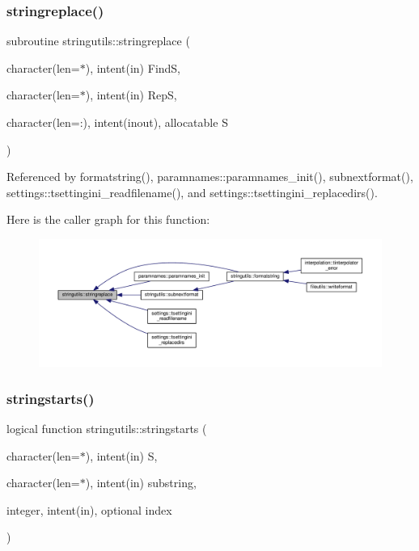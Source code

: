 \mbox{\label{namespacestringutils_aaf1a42410d8de4ec72b5f8f00f538f35}} 
\subsubsection{\texorpdfstring{stringreplace()}{stringreplace()}}
{\footnotesize\ttfamily subroutine stringutils\+::stringreplace (\begin{DoxyParamCaption}\item[{character(len=$\ast$), intent(in)}]{FindS,  }\item[{character(len=$\ast$), intent(in)}]{RepS,  }\item[{character(len=\+:), intent(inout), allocatable}]{S }\end{DoxyParamCaption})}



Referenced by formatstring(), paramnames\+::paramnames\+\_\+init(), subnextformat(), settings\+::tsettingini\+\_\+readfilename(), and settings\+::tsettingini\+\_\+replacedirs().

Here is the caller graph for this function\+:
\nopagebreak
\begin{figure}[H]
\begin{center}
\leavevmode
\includegraphics[width=350pt]{namespacestringutils_aaf1a42410d8de4ec72b5f8f00f538f35_icgraph}
\end{center}
\end{figure}
\mbox{\label{namespacestringutils_a83f80ac2eecd8ff5e8fd18faba396ec9}} 
\subsubsection{\texorpdfstring{stringstarts()}{stringstarts()}}
{\footnotesize\ttfamily logical function stringutils\+::stringstarts (\begin{DoxyParamCaption}\item[{character(len=$\ast$), intent(in)}]{S,  }\item[{character(len=$\ast$), intent(in)}]{substring,  }\item[{integer, intent(in), optional}]{index }\end{DoxyParamCaption})}



